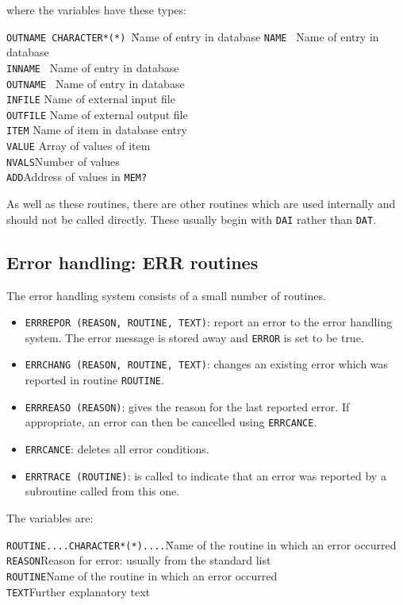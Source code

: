 where the variables have these types:
\begin{tabbing}
{\tt OUTNAME }\={\tt CHARACTER*(*) }\= Name of entry in database \kill
{\tt NAME }\> Name of entry in database \\
{\tt INNAME }\> Name of entry in database \\
{\tt OUTNAME }\> Name of entry in database \\
{\tt INFILE}\> Name of external input file \\
{\tt OUTFILE}\> Name of external output file \\
{\tt ITEM}\> Name of item in database entry \\
{\tt VALUE}\>{\tt        }\> Array of values of item\\
{\tt NVALS}\>Number of values\\
{\tt ADD}\>Address of values in {\tt MEM?}
\end{tabbing}

As well as these routines, there are other routines which are used internally
and should not be called directly. These usually begin with {\tt DAI} rather
than {\tt DAT}.

\subsection{Error handling: ERR routines}

The error handling system consists of a small number of routines.
\begin{itemize}
\item {\tt ERRREPOR (REASON, ROUTINE, TEXT)}: report an error to the error
handling system. The error message is stored away and {\tt ERROR} is set
to be true.
\item {\tt ERRCHANG (REASON, ROUTINE, TEXT)}: changes an existing error which
was reported in routine {\tt ROUTINE}.
\item {\tt ERRREASO (REASON)}: gives the reason for the last reported error. 
If appropriate, an error can then be cancelled using {\tt ERRCANCE}.
\item {\tt ERRCANCE}: deletes all error conditions.
\item {\tt ERRTRACE (ROUTINE)}: is called to indicate that an error was 
reported by a subroutine called from this one.
\end{itemize}
The variables are:
\begin{tabbing}
{\tt ROUTINE....}\={\tt CHARACTER*(*)....}\=Name of the routine in which an error occurred\kill
{\tt REASON}\>Reason for error: usually from the standard list\\
{\tt ROUTINE}\>Name of the routine in which an error occurred\\
{\tt TEXT}\>Further explanatory text
\end{tabbing}

